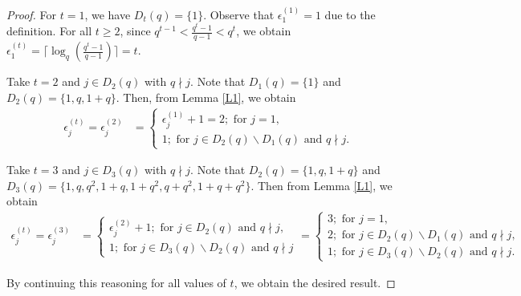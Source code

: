 \documentclass[10pt,a4paper]{amsart}
\begin{document}
    \begin{proof}
        For $t=1$, we have $D_{t}(q)=\{1\}$. Observe that $\epsilon_{1}^{(1)}=1$ due to the definition. For all $t\geq 2$, since $q^{t-1}<\frac{q^t-1}{q-1}<q^t$, we obtain $\epsilon_{1}^{(t)}=\Big\lceil\operatorname{log}_{q}\left(\frac{q^t-1}{q-1}\right)\Big\rceil=t$.
       \par Take $t=2$ and $j\in D_{2}(q)$ with $q\nmid j$. Note that $D_{1}(q)=\{1\}$ and $D_{2}(q)=\{1,q,1+q\}$. Then, from Lemma \ref{L1}, we obtain
       \begin{align*}
           \epsilon_{j}^{(t)}=\epsilon_{j}^{(2)} &=\begin{cases}
               \epsilon_{j}^{(1)}+1=2;\text{ for }j=1, \\
               1;\text{ for }j\in D_{2}(q)\backslash D_{1}(q)\text{ and }q\nmid j.
           \end{cases}
       \end{align*}
       \par Take $t=3$ and $j\in D_{3}(q)$ with $q\nmid j$. Note that $D_{2}(q)=\{1,q,1+q\}$ and $D_{3}(q)=\{1,q,q^2,1+q,1+q^2,q+q^2,1+q+q^2\}$. Then from Lemma \ref{L1}, we obtain
        \begin{align*}
           \epsilon_{j}^{(t)}=\epsilon_{j}^{(3)} &=\begin{cases}
               \epsilon_{j}^{(2)}+1;\text{ for }j\in D_{2}(q)\text{ and }q\nmid j, \\
               1;\text{ for }j\in D_{3}(q)\backslash D_{2}(q)\text{ and }q\nmid j
           \end{cases}
           =\begin{cases}
               3;\text{ for }j=1, \\
               2;\text{ for }j\in D_{2}(q)\backslash D_{1}(q)\text{ and }q\nmid j, \\
               1;\text{ for }j\in D_{3}(q)\backslash D_{2}(q)\text{ and }q\nmid j.
           \end{cases}
       \end{align*}
       \vskip 1pt
     \par  By continuing this reasoning for all values of $t$, we obtain the desired result.
    \end{proof}
\end{document}
